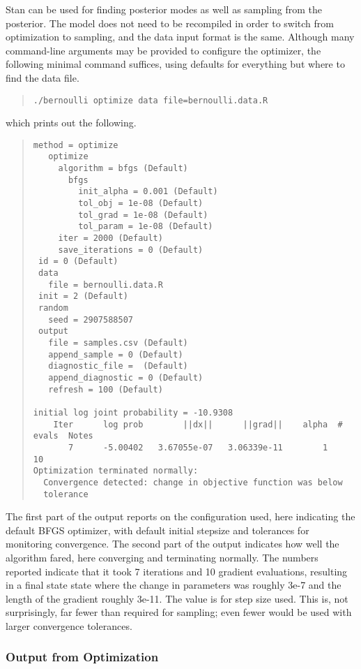 Stan can be used for finding posterior modes as well as sampling from
the posterior.   The model does not need to be recompiled in order to
switch from optimization to sampling, and the data input format is the
same.  Although many command-line arguments may be provided to
configure the optimizer, the following minimal command suffices, using
defaults for everything but where to find the data file.
%
\begin{quote}
\begin{Verbatim}[fontshape=sl]
./bernoulli optimize data file=bernoulli.data.R
\end{Verbatim}
\end{quote}
%
which prints out the following.
%
\begin{quote}
\begin{Verbatim}[fontsize=\footnotesize]
 method = optimize
   optimize
     algorithm = bfgs (Default)
       bfgs
         init_alpha = 0.001 (Default)
         tol_obj = 1e-08 (Default)
         tol_grad = 1e-08 (Default)
         tol_param = 1e-08 (Default)
     iter = 2000 (Default)
     save_iterations = 0 (Default)
 id = 0 (Default)
 data
   file = bernoulli.data.R
 init = 2 (Default)
 random
   seed = 2907588507
 output
   file = samples.csv (Default)
   append_sample = 0 (Default)
   diagnostic_file =  (Default)
   append_diagnostic = 0 (Default)
   refresh = 100 (Default)

initial log joint probability = -10.9308
    Iter      log prob        ||dx||      ||grad||    alpha  # evals  Notes 
       7      -5.00402   3.67055e-07   3.06339e-11        1       10   
Optimization terminated normally: 
  Convergence detected: change in objective function was below
  tolerance
\end{Verbatim}
\end{quote}
%
The first part of the output reports on the configuration used, here
indicating the default BFGS optimizer, with default initial stepsize
and tolerances for monitoring convergence.  The second part of the
output indicates how well the algorithm fared, here converging and
terminating normally.  The numbers reported indicate that it took 7
iterations and 10 gradient evaluations, resulting in a final state
state where the change in parameters was roughly 3e-7 and the length
of the gradient roughly 3e-11.  The  value is for step
size used.  This is, not surprisingly, far fewer than required for
sampling; even fewer would be used with larger convergence tolerances.


\subsubsection{Output from Optimization}

